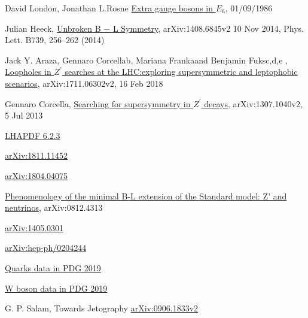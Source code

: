 \documentclass[12pt,a4paper]{article}		%
\begin{document}
\begin{thebibliography}{}
	 David London, Jonathan L.Rosne \href{https://journals.aps.org/prd/pdf/10.1103/PhysRevD.34.1530}{Extra gauge bosons in $E_6$}, 01/09/1986
	
	 Julian Heeck, \href{https://arxiv.org/pdf/1408.6845.pdf}{Unbroken B − L Symmetry}, arXiv:1408.6845v2 10 Nov 2014, Phys. Lett. B739, 256–262 (2014) 
	
	 Jack Y. Araza, Gennaro Corcellab, Mariana Frankaand Benjamin Fuksc,d,e , \href{https://arxiv.org/pdf/1711.06302.pdf}{Loopholes in $Z^\prime$ searches at the LHC:exploring supersymmetric and leptophobic scenarios}, arXiv:1711.06302v2, 16 Feb 2018 
	
	 Gennaro Corcella, \href{https://arxiv.org/pdf/1307.1040.pdf}{Searching for supersymmetry in $Z^\prime$ decays}, arXiv:1307.1040v2, 5 Jul 2013
	
	 \href{https://lhapdf.hepforge.org/pdfsets}{LHAPDF 6.2.3}
	
	 \href{https://arxiv.org/abs/1811.11452}{arXiv:1811.11452}
	
	 \href{https://arxiv.org/abs/1804.04075}{arXiv:1804.04075}
	
	 \href{https://arxiv.org/abs/0812.4313}{Phenomenology of the minimal B-L extension of the Standard model: Z' and neutrinos}, arXiv:0812.4313
	
	 \href{https://arxiv.org/abs/1405.0301}{arXiv:1405.0301}
	
	\href{https://arxiv.org/abs/hep-ph/0204244}{arXiv:hep-ph/0204244}
	
	 \href{http://pdg.lbl.gov/2019/tables/rpp2019-sum-quarks.pdf}{Quarks data in PDG 2019}
	
	 \href{http://pdg.lbl.gov/2019/listings/rpp2019-list-w-boson.pdf}{W boson data in PDG 2019}
	
	 G. P. Salam, Towards Jetography \href{https://arxiv.org/abs/0906.1833}{arXiv:0906.1833v2} 
	
\end{thebibliography} 
\end{document}
